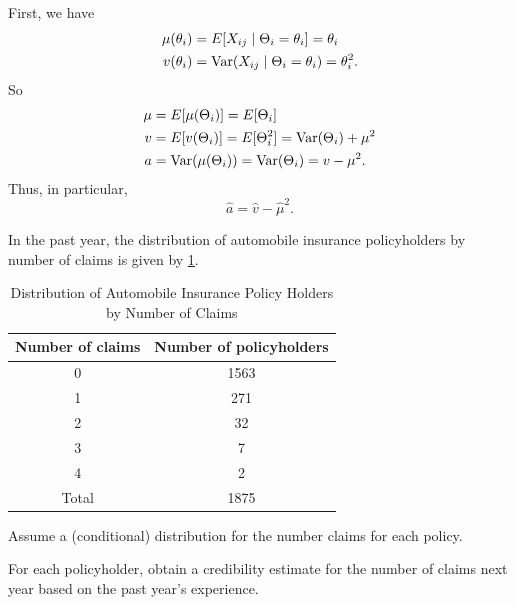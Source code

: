 \documentclass[notoc,notitlepage]{tufte-book}
\begin{document}
\begin{solution}
  First, we have
  \begin{align*}
    \mu(\theta_i) &= E[X_{ij} \mid \Theta_i = \theta_i] = \theta_i \\
    v(\theta_i) &= \operatorname{Var}(X_{ij} \mid \Theta_i = \theta_i) = \theta_i^2.
  \end{align*}
  So
  \begin{align*}
    \mu &= E[\mu(\Theta_i)] = E[\Theta_i] \\
    v &= E[v(\Theta_i)] = E[\Theta_i^2] = \operatorname{Var}(\Theta_i) + \mu^2 \\
    a &= \operatorname{Var}(\mu(\Theta_i)) = \operatorname{Var}(\Theta_i) = v - \mu^2.
  \end{align*}
  Thus, in particular,
  \begin{equation*}
    \hat{a} = \hat{v} - \hat{\mu}^2.
  \end{equation*}
\end{solution}

\begin{eg}
  In the past year, the distribution of automobile insurance policyholders
  by number of claims is given by
  \cref{table:distribution_of_automobile_insurance_policy_holders_by_number_of_claims}.
  \begin{table}[ht]
    \centering
    \caption{Distribution of Automobile Insurance Policy Holders by Number of
    Claims}
    \label{table:distribution_of_automobile_insurance_policy_holders_by_number_of_claims}
    \begin{tabular}{c c}
    Number of claims & Number of policyholders \\
    \hline
    0                & 1563 \\
    1                & 271 \\
    2                & 32 \\
    3                & 7 \\
    4                & 2 \\
    \hline
    Total            & 1875
    \end{tabular}
  \end{table}
  Assume a (conditional)  distribution for
  the number claims for each policy.

  For each policyholder, obtain a credibility estimate for
  the number of claims next year based on the past year's experience.
\end{eg}
\end{document}
